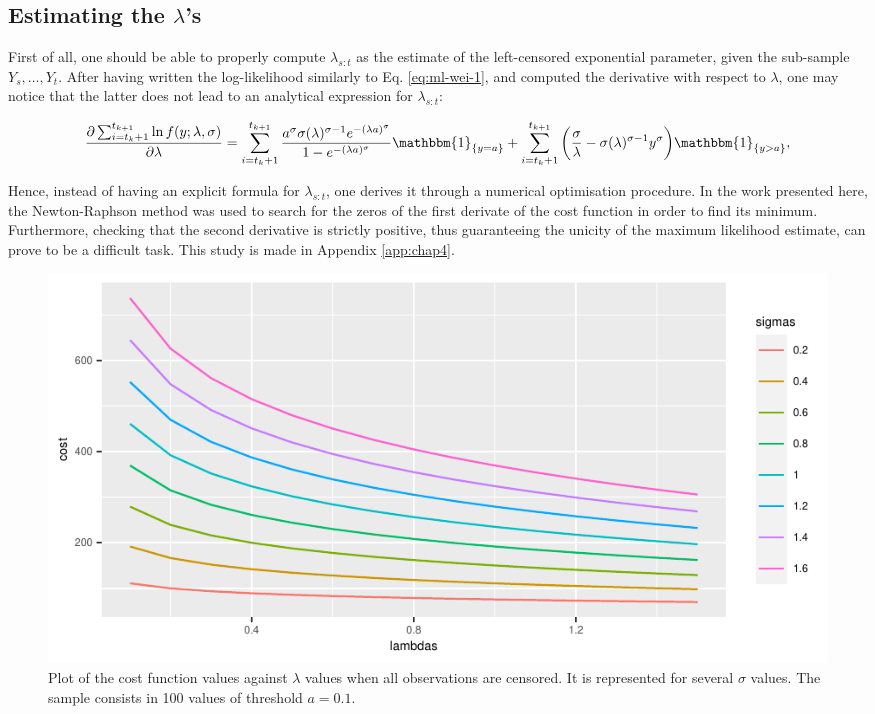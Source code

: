 \subsection{Estimating the \texorpdfstring{$\lambda$}{l}'s}

First of all, one should be able to properly compute $\lambda_{s:t}$ as the estimate of the left-censored exponential parameter, given the sub-sample $Y_s,\dots,Y_t$. After having written the log-likelihood similarly to Eq. \ref{eq:ml-wei-1}, and computed the derivative with respect to $\lambda$, one may notice that the latter does not lead to an analytical expression for $\lambda_{s:t}$:

\begin{equation}\label{eq:ml-wei-d1}
\frac{\partial\sum_{i=t_{k}+1}^{t_{k+1}}\ln f(y;\lambda,\sigma)}{\partial \lambda} = \sum_{i=t_{k}+1}^{t_{k+1}}\frac{a^\sigma\sigma(\lambda)^{\sigma-1}e^{-(\lambda a)^\sigma}}{1-e^{-(\lambda a)^\sigma}} \mathbbm{1}_{\lbrace y = a\rbrace }+\sum_{i=t_{k}+1}^{t_{k+1}}\bigg(\frac{\sigma}{\lambda} - \sigma(\lambda)^{\sigma-1}y^{\sigma}\bigg)\mathbbm{1}_{\lbrace y > a\rbrace}, 
\end{equation}

Hence, instead of having an explicit formula for $\lambda_{s:t}$, one derives it through a numerical optimisation procedure. In the work presented here, the Newton-Raphson method was used to search for the zeros of the first derivate of the cost function in order to find its minimum. Furthermore, checking that the second derivative is strictly positive, thus guaranteeing the unicity of the maximum likelihood estimate, can prove to be a difficult task. This study is made in Appendix \ref{app:chap4}.

\begin{figure}[ht]
    \centering
    \includegraphics{figs/Chap4/only_cens.pdf}
    \caption{Plot of the cost function values against $\lambda$ values when all observations are censored. It is represented for several $\sigma$ values. The sample consists in 100 values of threshold $a = 0.1$.}
    \label{fig:onlycens}
\end{figure}

